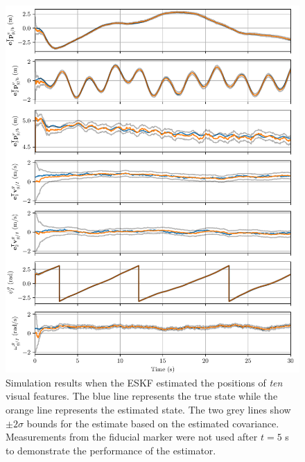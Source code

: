 \begin{figure}
  \centering
  \includegraphics[width=6.5in]{plots/single_run_with_lms}
  \caption[ESKF Simulation Results Using Ten Visual Features]{Simulation results
    when the ESKF estimated the positions of \emph{ten} visual
  features. The blue line represents the true state while the orange line
  represents the estimated state. The two grey lines show $\pm 2 \sigma$ bounds for
  the estimate based on the estimated covariance. Measurements from the fiducial
  marker were not used after $t = 5$ s
  to demonstrate the performance of the estimator.}
  \label{fig:with_lms}
\end{figure}



